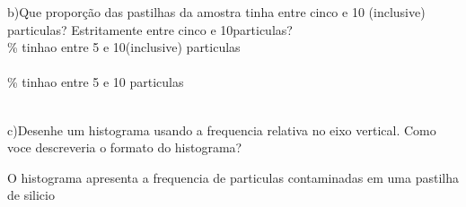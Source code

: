 \documentclass[12pt]{article}%
\begin{document}
 b)Que proporção das pastilhas da amostra tinha entre cinco e 10 (inclusive) particulas? Estritamente entre cinco e 10particulas?
 \\\pgfmathresult\% tinhao entre 5 e 10(inclusive) particulas\\
  \\\pgfmathresult\% tinhao entre 5 e 10 particulas

\\
c)Desenhe um histograma usando a frequencia relativa no eixo vertical. Como voce descreveria o formato do histograma?



\begin{center}
\end{center}

O histograma apresenta a frequencia de particulas contaminadas em uma pastilha de silicio
\end{document}
